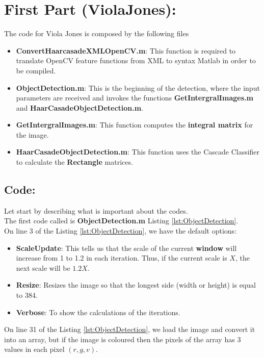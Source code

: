 \section{First Part (ViolaJones):}
The code for Viola Jones is composed by the following files
\begin{itemize}
	\item \textbf{ConvertHaarcasadeXMLOpenCV.m}: This function is required to translate OpenCV feature functions from XML to syntax Matlab in order to be compiled.
	\item \textbf{ObjectDetection.m}: This is the beginning of the detection, where the input parameters are received and invokes the functions \textbf{GetIntergralImages.m} and  \textbf{HaarCasadeObjectDetection.m}.
	\item \textbf{GetIntergralImages.m}: This function computes the \textbf{integral matrix} for the image.
	\item \textbf{HaarCasadeObjectDetection.m}: This function uses the Cascade Classifier to calculate the \textbf{Rectangle} matrices. 
\end{itemize}

\subsection{Code:}
\noindent Let start by describing what is important about the codes.\\
\noindent The first code called is \textbf{ObjectDetection.m} Listing \ref{lst:ObjectDetection}.\\%
\noindent On line 3 of the Listing \ref{lst:ObjectDetection}, we have the default options:
\begin{itemize}
	\item \textbf{ScaleUpdate}: This tells us that the scale of the current \textbf{window} will increase from 1 to 1.2 in each iteration. Thus, if the current scale is $X$, the next scale will be $1.2X$. 
	\item \textbf{Resize}: Resizes the image so that the longest side (width or height) is equal to 384.
	\item \textbf{Verbose}: To show the calculations of the iterations.
\end{itemize}

\noindent On line 31 of the Listing \ref{lst:ObjectDetection}, we load the image and convert it into an array, but if the image is coloured then the pixels of the array has 3 values in each pixel $(r,g,v)$.\\

